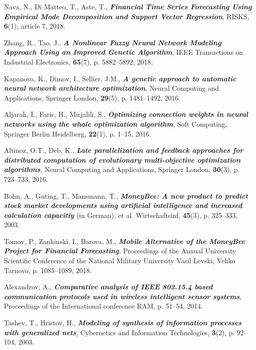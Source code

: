 \documentclass[graybox]{svmult}
\begin{document}
\begin{thebibliography}{99}

 Nava, N., Di Matteo, T., Aste, T., \textbf{\textit{Financial Time Series Forecasting Using Empirical Mode Decomposition and Support Vector Regression}}, RISKS, \textbf{6}(1), article 7, 2018.

 Zhang, R., Tao, J., \textbf{\textit{A Nonlinear Fuzzy Neural Network Modeling Approach Using an Improved Genetic Algorithm}}, IEEE Transactions on Industrial Electronics, \textbf{65}(7), p. 5882--5892, 2018.

 Kapanova, K., Dimov, I., Sellier, J.M., \textbf{\textit{A genetic approach to automatic neural network architecture optimization}}, Neural Computing and Applications, Springer London, \textbf{29}(5), p. 1481--1492, 2016.

 Aljarah, I., Faris, H., Mirjalili, S., \textbf{\textit{Optimizing connection weights in neural networks using the whale optimization algorithm}}, Soft Computing, Springer Berlin Heidelberg, \textbf{22}(1), p. 1--15, 2016.

 Altinoz, O.T., Deb, K., \textbf{\textit{Late parallelization and feedback approaches for distributed computation of evolutionary multi-objective optimization algorithms}}, Neural Computing and Applications, Springer London, \textbf{30}(3), p. 723--733, 2016.

 Bohn, A., Guting, T., Mansmann, T., \textbf{\textit{MoneyBee: A new product to predict stock market developments using artificial intelligence and increased calculation capacitiy}} (in German), et al. Wirtschaftsinf, \textbf{45}(3), p. 325--333, 2003.

 Tomov, P., Zankinski, I., Barova, M., \textbf{\textit{Mobile Alternative of the MoneyBee Project for Financial Forecasting}}, Proceedings of the Annual University Scientific Conference of the National Military University Vasil Levski, Veliko Tarnovo, p. 1085--1089, 2018.

 Alexandrov, A., \textbf{\textit{Comparative analysis of IEEE 802.15.4 based communication protocols used in wireless intelligent sensor systems}}, Proceedings of the International conference RAM, p. 51--54, 2014.

 Tashev, T., Hristov, H., \textbf{\textit{Modeling of synthesis of information processes with generalized nets}}, Cybernetics and Information Technologies, \textbf{3}(2), p. 92--104, 2003.

\end{thebibliography}
\end{document}
